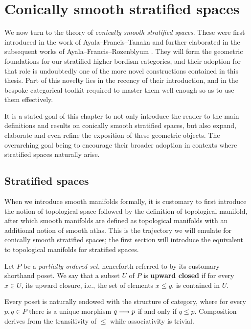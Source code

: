 



\chapter{Conically smooth stratified spaces}

We now turn to the theory of \emph{conically smooth stratified spaces}. These were first introduced in the work of Ayala--Francis--Tanaka and further elaborated in the subsequent works of Ayala--Francis--Rozenblyum \cite{AFT1, AFR1, AFR2}. They will form the geometric foundations for our stratified higher bordism categories, and their adoption for that role is undoubtedly one of the more novel constructions contained in this thesis. Part of this novelty lies in the recency of their introduction, and in the bespoke categorical toolkit required to master them well enough so as to use them effectively. 

It is a stated goal of this chapter to not only introduce the reader to the main definitions and results on conically smooth stratified spaces, but also expand, elaborate and even refine the exposition of these geometric objects. The overarching goal being to encourage their broader adoption in contexts where stratified spaces naturally arise.

\section{Stratified spaces}

When we introduce smooth manifolds formally, it is customary to first introduce the notion of topological space followed by the definition of topological manifold, after which smooth manifolds are defined as topological manifolds with an additional notion of smooth atlas. This is the trajectory we will emulate for conically smooth stratified spaces; the first section will introduce the equivalent to topological manifolds for stratified spaces.       

\begin{definition}\label{ch4:: def: upward closed}
    Let $P$ be a \textit{partially ordered set}, henceforth referred to by its customary shorthand poset. We say that a subset $U$ of $P$ is \textbf{upward closed} if for every $x \in U$, its upward closure, i.e., the set of elements $x\leq y$, is contained in $U$. 
\end{definition} 

\begin{observation}
Every poset is naturally endowed with the structure of category, where for every $p,q \in P$ there is a unique morphism $q \longrightarrow p$ if and only if $q\leq p$. Composition derives from the transitivity of $\leq$ while associativity is trivial.
\end{observation}

